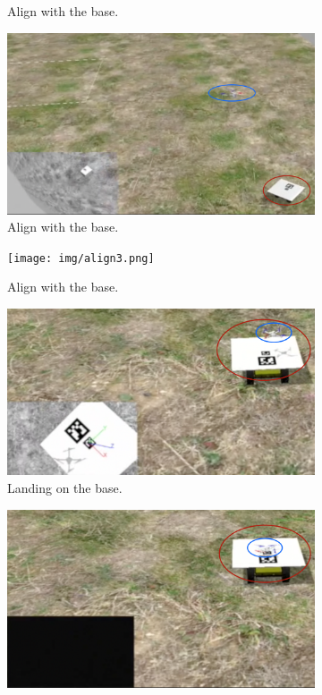 \begin{figure}[!htbp]
\begin{subfigure}[b]{0.3\textwidth}
        \caption{Align with the base.}
        \label{fig:three}
   \end{subfigure}
    \begin{subfigure}[b]{0.3\textwidth}
        \includegraphics[width=\textwidth]{img/approaching3.png}
        \caption{Align with the base.}
        \label{fig:three}
   \end{subfigure}
   \begin{subfigure}[b]{0.3\textwidth}
        \texttt{[image: img/align3.png]}
        \caption{Align with the base.}
        \label{fig:three}
   \end{subfigure}
    \begin{subfigure}[b]{0.3\textwidth}
        \includegraphics[width=\textwidth]{img/landing3.png}
        \caption{Landing on the base.}
        \label{fig:four}
   \end{subfigure} 
    \begin{subfigure}[b]{0.3\textwidth}
        \includegraphics[width=\textwidth]{img/landed3.png}

\end{subfigure}
\end{figure}
